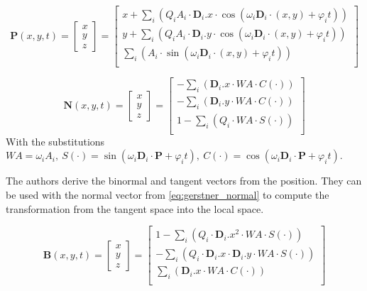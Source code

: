 \begin{equation}\label{eq:gerstner_position}
    \textbf{P}(x,y,t)=\begin{bmatrix}x\\ y\\ z\end{bmatrix}=\begin{bmatrix} x +
    \sum_{i}(Q_i A_i\cdot\textbf{D}_i.x\cdot \cos(\omega_i \textbf{D}_i\cdot
    (x,y) + \varphi_i t))\\ y + \sum_{i}(Q_i A_i\cdot\textbf{D}_i.y\cdot
    \cos(\omega_i \textbf{D}_i\cdot (x,y) + \varphi_i t))\\ \sum_{i}(A_i\cdot
\sin(\omega_i \textbf{D}_i\cdot (x,y) + \varphi_i t))\\\end{bmatrix}
\end{equation}

\begin{equation}\label{eq:gerstner_normal}
    \textbf{N}(x,y,t)=\begin{bmatrix}x\\ y\\ z\end{bmatrix}=\begin{bmatrix}
    - \sum_{i}(\textbf{D}_i.x\cdot WA \cdot C(\cdot))\\ 
    - \sum_{i}(\textbf{D}_i.y\cdot WA \cdot C(\cdot))\\ 
    1-\sum_{i}(Q_i \cdot WA \cdot S(\cdot))\\\end{bmatrix}
\end{equation}
%
With the substitutions $WA = \omega_i A_i,\ S(\cdot) = \sin(\omega_i
\textbf{D}_i \cdot \textbf{P} + \varphi_i t),\ C(\cdot) = \cos(\omega_i
\textbf{D}_i \cdot \textbf{P} + \varphi_i t)$.

The authors derive the binormal and tangent vectors from the position. They can
be used with the normal vector from \autoref{eq:gerstner_normal} to compute the
transformation from the tangent space into the local space.

\begin{equation}\label{eq:gerstner_binormal}
    \textbf{B}(x,y,t)=\begin{bmatrix}x\\ y\\ z\end{bmatrix}=\begin{bmatrix}
    1 - \sum_{i}(Q_i \cdot \textbf{D}_i.x^2 \cdot WA \cdot S(\cdot))\\
    - \sum_{i}(Q_i \cdot \textbf{D}_i.x \cdot \textbf{D}_i.y\cdot WA \cdot
    S(\cdot))\\ 
    \sum_{i}(\textbf{D}_i.x \cdot WA \cdot C(\cdot))\\\end{bmatrix}
\end{equation}

